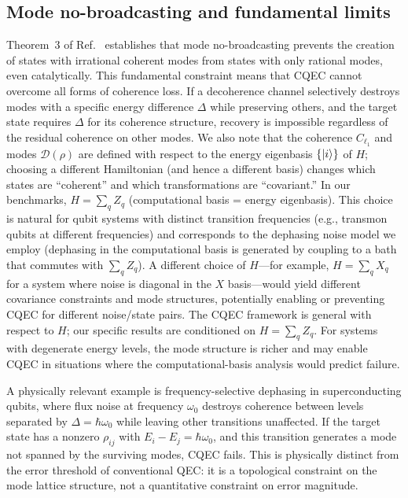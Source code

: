 \documentclass[prx,twocolumn,superscriptaddress,longbibliography,floatfix]{revtex4-2}
\begin{document}
\subsection{Mode no-broadcasting and fundamental limits}
\label{sec:no_broadcasting}

Theorem~3 of Ref.~\cite{Shiraishi2024} establishes that mode no-broadcasting prevents the creation of states with irrational coherent modes from states with only rational modes, even catalytically.
This fundamental constraint means that CQEC cannot overcome all forms of coherence loss.
If a decoherence channel selectively destroys modes with a specific energy difference $\Delta$ while preserving others, and the target state requires $\Delta$ for its coherence structure, recovery is impossible regardless of the residual coherence on other modes.
We also note that the coherence $C_{\ell_1}$ and modes $\mathcal{D}(\rho)$ are defined with respect to the energy eigenbasis $\{\ket{i}\}$ of $H$; choosing a different Hamiltonian (and hence a different basis) changes which states are ``coherent'' and which transformations are ``covariant.''
In our benchmarks, $H = \sum_q Z_q$ (computational basis = energy eigenbasis).
This choice is natural for qubit systems with distinct transition frequencies (e.g., transmon qubits at different frequencies) and corresponds to the dephasing noise model we employ (dephasing in the computational basis is generated by coupling to a bath that commutes with $\sum_q Z_q$).
A different choice of $H$---for example, $H = \sum_q X_q$ for a system where noise is diagonal in the $X$ basis---would yield different covariance constraints and mode structures, potentially enabling or preventing CQEC for different noise/state pairs.
The CQEC framework is general with respect to $H$; our specific results are conditioned on $H = \sum_q Z_q$.
For systems with degenerate energy levels, the mode structure is richer and may enable CQEC in situations where the computational-basis analysis would predict failure.

A physically relevant example is frequency-selective dephasing in superconducting qubits, where flux noise at frequency $\omega_0$ destroys coherence between levels separated by $\Delta = \hbar\omega_0$ while leaving other transitions unaffected.
If the target state has a nonzero $\rho_{ij}$ with $E_i - E_j = \hbar\omega_0$, and this transition generates a mode not spanned by the surviving modes, CQEC fails.
This is physically distinct from the error threshold of conventional QEC: it is a topological constraint on the mode lattice structure, not a quantitative constraint on error magnitude.
\end{document}
